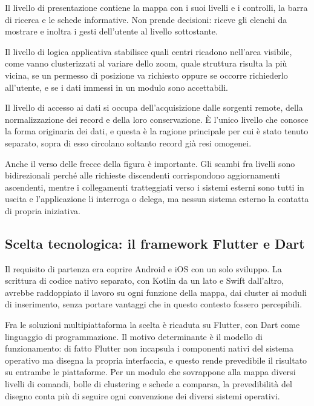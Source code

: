 Il livello di presentazione contiene la mappa con i suoi livelli e i controlli, la barra di ricerca e
le schede informative.
Non prende decisioni: riceve gli elenchi da mostrare e inoltra i gesti dell'utente al livello sottostante.

Il livello di logica applicativa stabilisce quali centri ricadono nell'area visibile, come vanno clusterizzati al
variare dello zoom, quale struttura risulta la più vicina, se un permesso di posizione va richiesto oppure se occorre
richiederlo all'utente, e se i dati immessi in un modulo sono accettabili.

Il livello di accesso ai dati si occupa dell'acquisizione dalle sorgenti remote, della normalizzazione dei record e della loro conservazione.
È l'unico livello che conosce la forma originaria dei dati, e questa è la ragione principale per cui è stato tenuto separato,
sopra di esso circolano soltanto record già resi omogenei.

Anche il verso delle frecce della figura è importante.
Gli scambi fra livelli sono bidirezionali perché alle richieste discendenti corrispondono aggiornamenti ascendenti, mentre i
collegamenti tratteggiati verso i sistemi esterni sono tutti in uscita e l'applicazione li interroga o delega, ma nessun sistema
esterno la contatta di propria iniziativa.

\subsection{Scelta tecnologica: il framework Flutter e Dart}\label{subsec:scelta-flutter}

Il requisito di partenza era coprire Android e iOS con un solo sviluppo.
La scrittura di codice nativo separato, con Kotlin da un lato e Swift dall'altro, avrebbe raddoppiato il lavoro su ogni funzione della
mappa, dai cluster ai moduli di inserimento, senza portare vantaggi che in questo contesto fossero percepibili.

Fra le soluzioni multipiattaforma la scelta è ricaduta su Flutter, con Dart come linguaggio di programmazione.
Il motivo determinante è il modello di funzionamento: di fatto Flutter non incapsula i componenti nativi del sistema operativo
ma disegna la propria interfaccia, e questo rende prevedibile il risultato su entrambe le piattaforme.
Per un modulo che sovrappone alla mappa diversi livelli di comandi, bolle di clustering e schede a comparsa, la prevedibilità
del disegno conta più di seguire ogni convenzione dei diversi sistemi operativi.

